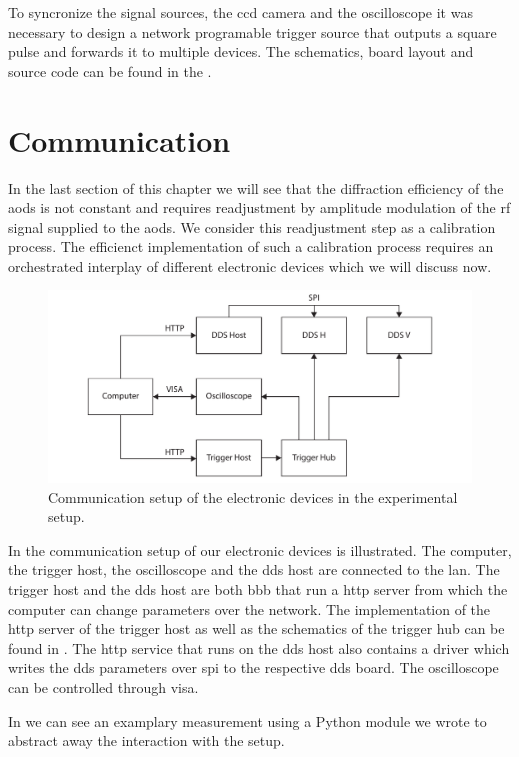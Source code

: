 To syncronize the signal sources, the \gls{ccd} camera and the oscilloscope
it was necessary to design a network programable trigger source that outputs
a square pulse and forwards it to multiple devices. The schematics, board
layout and source code can be found in the .

\section{Communication}

In the last section of this chapter we will see that the diffraction
efficiency of the \gls{aod}s is not constant and requires readjustment by
amplitude modulation of the \gls{rf} signal supplied to the \gls{aod}s. We
consider this readjustment step as a calibration process. The efficienct
implementation of such a calibration process requires an orchestrated
interplay of different electronic devices which we will discuss now.
\begin{figure}[htb]
  \centering
  \includegraphics[width=\textwidth]{../figure/setup/network.pdf}
  \caption{Communication setup of the electronic devices in the experimental
    setup.
  }\label{fig:setup_network}
\end{figure}
In  the communication setup of our electronic devices
is illustrated. The computer, the trigger host, the oscilloscope and the
\gls{dds} host are connected to the \gls{lan}. The trigger host and the
\gls{dds} host are both \gls{bbb} that run a \gls{http} server from which the
computer can change parameters over the network. The implementation of the
\gls{http} server of the trigger host as well as the schematics of the trigger
hub can be found in . The \gls{http} service
that runs on the \gls{dds} host also contains a driver which writes the
\gls{dds} parameters over \gls{spi} to the respective \gls{dds} board. The
oscilloscope can be controlled through \gls{visa}.
In  we can see an examplary measurement using a
Python module we wrote to abstract away the interaction with the setup.

